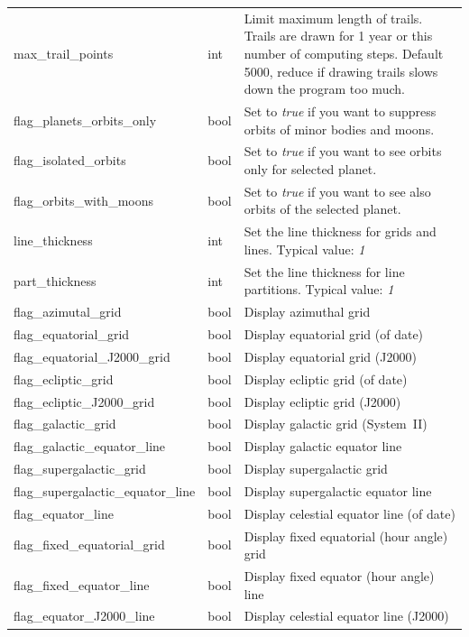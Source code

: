 \begin{longtable}{l|l|p{77mm}}
max\_trail\_points            & int  & Limit maximum length of trails. Trails are drawn for 1 year or this number of computing steps.
                                       Default 5000, reduce if drawing trails slows down the program too much.\\
flag\_planets\_orbits\_only   & bool & Set to \emph{true} if you want to suppress orbits of minor bodies and moons.\\
flag\_isolated\_orbits        & bool & Set to \emph{true} if you want to see orbits only for selected planet.\\
flag\_orbits\_with\_moons     & bool & Set to \emph{true} if you want to see also orbits of the selected planet.\\\midrule
line\_thickness               & int  & Set the line thickness for grids and lines. Typical value: \emph{1}\\%
part\_thickness               & int  & Set the line thickness for line partitions. Typical value: \emph{1}\\\midrule
flag\_azimutal\_grid          & bool & Display azimuthal grid \\%
flag\_equatorial\_grid        & bool & Display equatorial grid (of date) \\%
flag\_equatorial\_J2000\_grid & bool & Display equatorial grid (J2000) \\%
flag\_ecliptic\_grid          & bool & Display ecliptic grid (of date) \\%
flag\_ecliptic\_J2000\_grid   & bool & Display ecliptic grid (J2000) \\%
flag\_galactic\_grid          & bool & Display galactic grid (System~II)\\%
flag\_galactic\_equator\_line & bool & Display galactic equator line \\%
flag\_supergalactic\_grid          & bool & Display supergalactic grid\\%
flag\_supergalactic\_equator\_line & bool & Display supergalactic equator line \\%
flag\_equator\_line           & bool & Display celestial equator line (of date) \\%
flag\_fixed\_equatorial\_grid & bool & Display fixed equatorial (hour angle) grid \\%
flag\_fixed\_equator\_line    & bool & Display fixed equator (hour angle) line\\%
flag\_equator\_J2000\_line    & bool & Display celestial equator line (J2000) \\%

\end{longtable}
